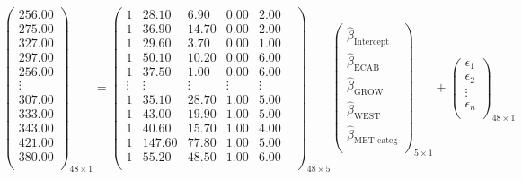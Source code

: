\documentclass{article}
\begin{document}
\begin{equation}
\begin{pmatrix}256.00\\ 275.00\\ 327.00\\ 297.00\\ 256.00\\ \vdots\\307.00\\ 333.00\\ 343.00\\ 421.00\\ 380.00\\ 
    \end{pmatrix}_{48 \times 1}=
    \begin{pmatrix}
        1 & 28.10 & 6.90 & 0.00 & 2.00 & \\1 & 36.90 & 14.70 & 0.00 & 2.00 & \\1 & 29.60 & 3.70 & 0.00 & 1.00 & \\1 & 50.10 & 10.20 & 0.00 & 6.00 & \\1 & 37.50 & 1.00 & 0.00 & 6.00 & \\
        \vdots & \vdots & \vdots & \vdots & \vdots\\
        1 & 35.10 & 28.70 & 1.00 & 5.00 & \\1 & 43.00 & 19.90 & 1.00 & 5.00 & \\1 & 40.60 & 15.70 & 1.00 & 4.00 & \\1 & 147.60 & 77.80 & 1.00 & 5.00 & \\1 & 55.20 & 48.50 & 1.00 & 6.00 & \\
    \end{pmatrix}_{48 \times 5}
    \begin{pmatrix}
        \hat{\beta}_\text{Intercept}\\\hat{\beta}_\text{ECAB}\\
        \hat{\beta}_\text{GROW}\\\hat{\beta}_\text{WEST}\\
        \hat{\beta}_\text{MET-categ}\\
    \end{pmatrix}_{5 \times 1}+
    \begin{pmatrix}
        \epsilon_1\\
        \epsilon_2\\
        \vdots\\
        \epsilon_n\\
    \end{pmatrix}_{48 \times 1}
\end{equation}
\end{document}
